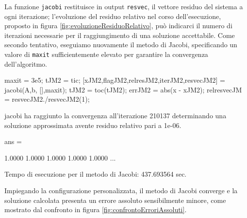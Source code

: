 La funzione \lstinline{jacobi} restituisce in output \lstinline{resvec}, il vettore residuo del sistema a ogni iterazione; l'evoluzione del
residuo relativo nel corso dell'esecuzione, proposto in figura \ref{fig:evoluzioneResiduoRelativo}, pu\`o indicarci il numero di iterazioni necessarie
per il raggiungimento di una soluzione accettabile.\newline
Come secondo tentativo, eseguiamo nuovamente il metodo di Jacobi, specificando un valore di \lstinline{maxit} sufficientemente elevato per garantire la 
convergenza dell'algoritmo.
\begin{matlabcode}
    maxit = 3e5;
    tJM2 = tic;
    [xJM2,flagJM2,relresJM2,iterJM2,resvecJM2] = jacobi(A,b,
                                                 [],maxit);
    tJM2 = toc(tJM2);
    errJM2 = abs(x - xJM2);
    relresvecJM = resvecJM2./resvecJM2(1);
\end{matlabcode}
\begin{matlaboutput}
    jacobi ha raggiunto la convergenza all'iterazione 210137
    determinando una soluzione approssimata avente residuo
    relativo pari a 1e-06.

    ans =

    1.0000    1.0000    1.0000    1.0000    1.0000    ...
\end{matlaboutput}
\begin{matlaboutput}
Tempo di esecuzione per il metodo di Jacobi: 437.693564 sec.
\end{matlaboutput}
Impiegando la configurazione personalizzata, il metodo di Jacobi converge e la soluzione calcolata presenta un errore assoluto sensibilmente minore, come 
mostrato dal confronto in figura \ref{fig:confrontoErroriAssoluti}.


